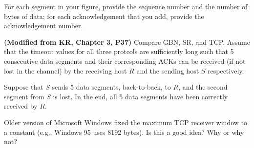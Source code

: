 \documentclass[a4paper,11pt]{exam}
\begin{document}
\begin{questions}
\begin{parts}
For each segment in your figure, provide the sequence number and the number of bytes of data; for each acknowledgement that you add, provide the acknowledgement number.
\end{parts}

\question 
\textbf{(Modified from KR, Chapter 3, P37)}
Compare GBN, SR, and TCP. Assume that the timeout values for all three protcols are sufficiently long such that 5 consecutive data segments and their corresponding ACKs can be received (if not lost in the channel) by the receiving host $R$ and the sending host $S$ respectively.  

Suppose that $S$ sends 5 data segments, back-to-back, to $R$, and the second segment from $S$ is lost.  In the end, all 5 data segments have been correctly received by $R$.


\question Older version of Microsoft Windows fixed the maximum TCP receiver window 
to a constant (e.g., Windows 95 uses 8192 bytes).  Is this a good idea?  Why or why not?

\end{questions}
\end{document}
